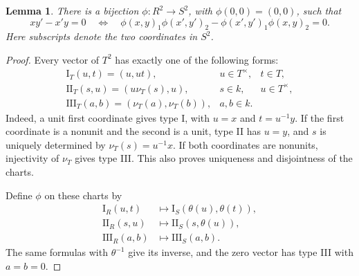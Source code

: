 \documentclass[11pt]{article}
\newtheorem{lemma}[theorem]{Lemma}
\begin{document}
\begin{lemma}\label{lem:charts}
There is a bijection $\phi:R^2\to S^2$, with $\phi(0,0)=(0,0)$, such that
\[
 xy'-x'y=0\quad\Longleftrightarrow\quad
 \phi(x,y)_1\phi(x',y')_2-\phi(x',y')_1\phi(x,y)_2=0.
\]
Here subscripts denote the two coordinates in $S^2$.
\end{lemma}
\begin{proof}
Every vector of $T^2$ has exactly one of the following forms:
\[
\begin{array}{lll}
 \mathrm I_T(u,t)=(u,ut), &u\in T^\times,&t\in T,\\
 \mathrm {II}_T(s,u)=(u\nu_T(s),u),&s\in k,&u\in T^\times,\\
 \mathrm {III}_T(a,b)=(\nu_T(a),\nu_T(b)),&a,b\in k.&
\end{array}
\]
Indeed, a unit first coordinate gives type I, with $u=x$ and $t=u^{-1}y$.
If the first coordinate is a nonunit and the second is a unit, type II
has $u=y$, and $s$ is uniquely determined by $\nu_T(s)=u^{-1}x$.
If both coordinates are nonunits, injectivity of $\nu_T$ gives type III.
This also proves uniqueness and disjointness of the charts.

Define $\phi$ on these charts by
\begin{align*}
 \mathrm I_R(u,t)&\longmapsto \mathrm I_S(\theta(u),\theta(t)),\\
 \mathrm {II}_R(s,u)&\longmapsto \mathrm {II}_S(s,\theta(u)),\\
 \mathrm {III}_R(a,b)&\longmapsto \mathrm {III}_S(a,b).
\end{align*}
The same formulas with $\theta^{-1}$ give its inverse, and the zero
vector has type III with $a=b=0$.


\end{proof}
\end{document}
